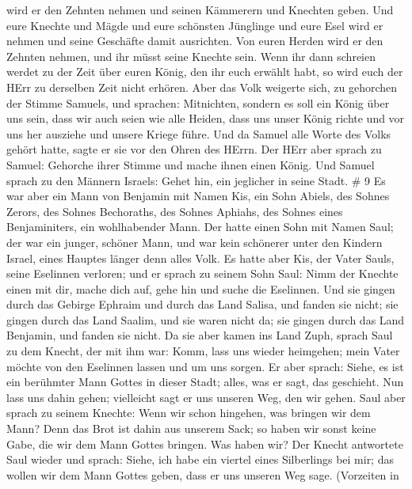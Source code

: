 wird er den Zehnten nehmen und seinen Kämmerern und Knechten geben.
 Und eure Knechte und Mägde und eure schönsten Jünglinge
und eure Esel wird er nehmen und seine Geschäfte damit ausrichten.
 Von euren Herden wird er den Zehnten nehmen, und ihr müsst
seine Knechte sein.  Wenn ihr dann schreien werdet zu der
Zeit über euren König, den ihr euch erwählt habt, so wird euch der HErr
zu derselben Zeit nicht erhören.  Aber das Volk weigerte
sich, zu gehorchen der Stimme Samuels, und sprachen: Mitnichten, sondern
es soll ein König über uns sein,  dass wir auch seien wie
alle Heiden, dass uns unser König richte und vor uns her ausziehe und
unsere Kriege führe.  Und da Samuel alle Worte des Volks
gehört hatte, sagte er sie vor den Ohren des HErrn.  Der
HErr aber sprach zu Samuel: Gehorche ihrer Stimme und mache ihnen einen
König. Und Samuel sprach zu den Männern Israels: Gehet hin, ein
jeglicher in seine Stadt. \# 9  Es war aber ein Mann von
Benjamin mit Namen Kis, ein Sohn Abiels, des Sohnes Zerors, des Sohnes
Bechoraths, des Sohnes Aphiahs, des Sohnes eines Benjaminiters, ein
wohlhabender Mann.  Der hatte einen Sohn mit Namen Saul; der
war ein junger, schöner Mann, und war kein schönerer unter den Kindern
Israel, eines Hauptes länger denn alles Volk.  Es hatte aber
Kis, der Vater Sauls, seine Eselinnen verloren; und er sprach zu seinem
Sohn Saul: Nimm der Knechte einen mit dir, mache dich auf, gehe hin und
suche die Eselinnen.  Und sie gingen durch das Gebirge
Ephraim und durch das Land Salisa, und fanden sie nicht; sie gingen
durch das Land Saalim, und sie waren nicht da; sie gingen durch das Land
Benjamin, und fanden sie nicht.  Da sie aber kamen ins Land
Zuph, sprach Saul zu dem Knecht, der mit ihm war: Komm, lass uns wieder
heimgehen; mein Vater möchte von den Eselinnen lassen und um uns sorgen.
 Er aber sprach: Siehe, es ist ein berühmter Mann Gottes in
dieser Stadt; alles, was er sagt, das geschieht. Nun lass uns dahin
gehen; vielleicht sagt er uns unseren Weg, den wir gehen. 
Saul aber sprach zu seinem Knechte: Wenn wir schon hingehen, was bringen
wir dem Mann? Denn das Brot ist dahin aus unserem Sack; so haben wir
sonst keine Gabe, die wir dem Mann Gottes bringen. Was haben wir?
 Der Knecht antwortete Saul wieder und sprach: Siehe, ich
habe ein viertel eines Silberlings bei mir; das wollen wir dem Mann
Gottes geben, dass er uns unseren Weg sage.  (Vorzeiten in
